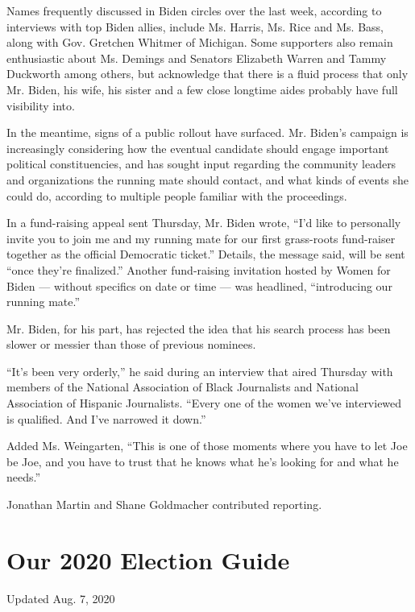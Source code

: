 Names frequently discussed in Biden circles over the last week,
according to interviews with top Biden allies, include Ms. Harris, Ms.
Rice and Ms. Bass, along with Gov. Gretchen Whitmer of Michigan. Some
supporters also remain enthusiastic about Ms. Demings and Senators
Elizabeth Warren and Tammy Duckworth among others, but acknowledge that
there is a fluid process that only Mr. Biden, his wife, his sister and a
few close longtime aides probably have full visibility into.

In the meantime, signs of a public rollout have surfaced. Mr. Biden's
campaign is increasingly considering how the eventual candidate should
engage important political constituencies, and has sought input
regarding the community leaders and organizations the running mate
should contact, and what kinds of events she could do, according to
multiple people familiar with the proceedings.

In a fund-raising appeal sent Thursday, Mr. Biden wrote, ``I'd like to
personally invite you to join me and my running mate for our first
grass-roots fund-raiser together as the official Democratic ticket.''
Details, the message said, will be sent ``once they're finalized.''
Another fund-raising invitation hosted by Women for Biden --- without
specifics on date or time --- was headlined, ``introducing our running
mate.''

Mr. Biden, for his part, has rejected the idea that his search process
has been slower or messier than those of previous nominees.

``It's been very orderly,'' he said during an interview that aired
Thursday with members of the National Association of Black Journalists
and National Association of Hispanic Journalists. ``Every one of the
women we've interviewed is qualified. And I've narrowed it down.''

Added Ms. Weingarten, ``This is one of those moments where you have to
let Joe be Joe, and you have to trust that he knows what he's looking
for and what he needs.''

Jonathan Martin and Shane Goldmacher contributed reporting.

\hypertarget{our-2020-election-guide}{%
\section{Our 2020 Election Guide}\label{our-2020-election-guide}}

Updated Aug. 7, 2020

